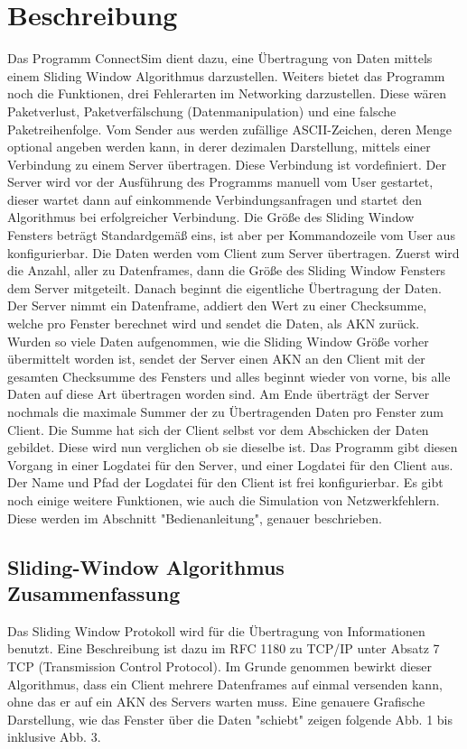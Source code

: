\documentclass{article}
\begin{document}
\section{Beschreibung}
Das Programm ConnectSim dient dazu, eine Übertragung von Daten mittels einem Sliding Window Algorithmus darzustellen.
Weiters bietet das Programm noch die Funktionen, drei Fehlerarten im Networking darzustellen. Diese wären Paketverlust,
Paketverfälschung (Datenmanipulation) und eine falsche Paketreihenfolge. Vom Sender aus werden zufällige ASCII-Zeichen, deren
Menge optional angeben werden kann, in derer dezimalen Darstellung, mittels einer Verbindung zu einem Server übertragen. Diese
Verbindung ist vordefiniert. Der Server wird vor der Ausführung des Programms manuell vom User gestartet, dieser wartet dann auf einkommende Verbindungsanfragen und startet den Algorithmus bei erfolgreicher Verbindung. \newline
Die Größe des Sliding Window Fensters beträgt Standardgemäß eins, ist aber per Kommandozeile vom User aus konfigurierbar.
Die Daten werden vom Client zum Server übertragen. Zuerst wird die Anzahl, aller zu  Datenframes, dann die Größe des Sliding Window Fensters dem Server mitgeteilt. Danach beginnt die eigentliche Übertragung der Daten. Der Server nimmt ein Datenframe, addiert den Wert zu einer Checksumme, 
welche pro Fenster berechnet wird und sendet die Daten, als AKN zurück. Wurden so viele Daten aufgenommen, wie die Sliding Window Größe vorher übermittelt worden
ist, sendet der Server einen AKN an den Client mit der gesamten Checksumme des Fensters und alles beginnt wieder von vorne, bis alle Daten auf diese Art übertragen worden
sind.\newline
Am Ende überträgt der Server nochmals die maximale Summer der zu Übertragenden Daten pro Fenster zum Client. Die Summe hat sich der Client selbst vor dem Abschicken der
Daten gebildet. Diese wird nun verglichen ob sie dieselbe ist. 
\newline\newline
Das Programm gibt diesen Vorgang in einer Logdatei für den Server, und einer Logdatei für den Client aus. Der Name und Pfad der Logdatei für den Client ist frei konfigurierbar.
Es gibt noch einige weitere Funktionen, wie auch die Simulation von Netzwerkfehlern. Diese werden im Abschnitt "Bedienanleitung", genauer beschrieben.


\subsection{Sliding-Window Algorithmus Zusammenfassung}
Das Sliding Window Protokoll wird für die Übertragung von Informationen benutzt. Eine Beschreibung ist dazu im RFC 1180 zu TCP/IP unter Absatz 7 TCP (Transmission Control Protocol).
Im Grunde genommen bewirkt dieser Algorithmus, dass ein Client mehrere Datenframes auf einmal versenden kann, ohne das er auf ein AKN des Servers warten muss. Eine genauere Grafische Darstellung,
wie das Fenster über die Daten "schiebt" zeigen folgende Abb. 1 bis inklusive Abb. 3.
\end{document}
